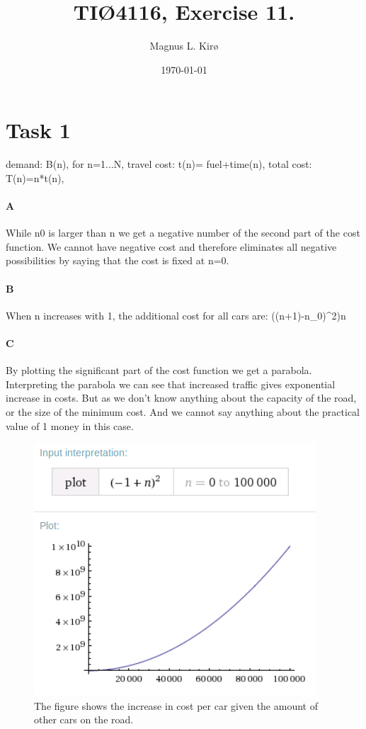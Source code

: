 \documentclass[12pt, a4paper]{article}
\title{
	TIØ4116, Exercise 11. 
}
\author{
	Magnus L. Kirø \\
}
\date{\today}
\begin{document}
\maketitle
{}

\section{Task 1}
demand: B(n), for n=1...N,
travel cost: t(n)= fuel+time(n),
total cost: T(n)=n*t(n),

\paragraph{A}
While n0 is larger than n we get a negative number of the second part of the
cost function. We cannot have negative cost and therefore eliminates all
negative possibilities by saying that the cost is fixed at n=0.  

\paragraph{B}
When n increases with 1, the additional cost for all cars are:
((n+1)-n_{0})^2)n

\paragraph{C}
By plotting the significant part of the cost function we get a parabola.
Interpreting the parabola we can see that increased traffic gives exponential
increase in costs. But as we don't know anything about the capacity of the
road, or the size of the minimum cost. And we cannot say anything about the
practical value of 1 money in this case. 

\begin{figure}[htb]
    \centering
    \includegraphics[width=\textwidth]{plot} 
    \label{fig:plot}
The figure shows the increase in cost per car given the amount of other cars on
the road. 
\end{figure}
\end{document}
